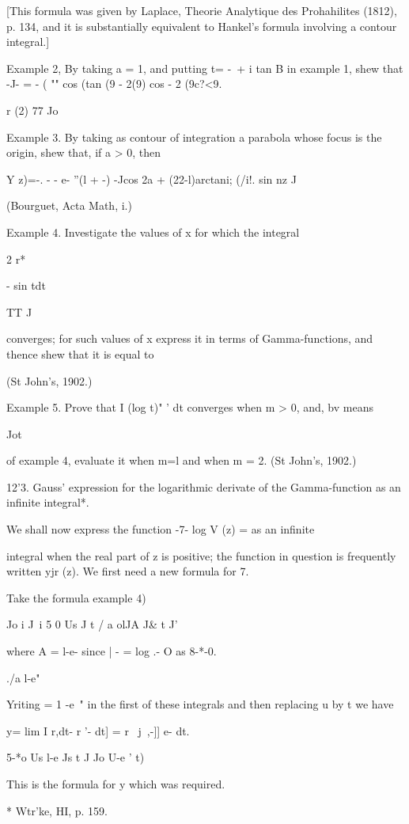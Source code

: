 [This formula was given by Laplace, Theorie Analytique des
Prohahilites (1812), p. 134, and it is substantially equivalent to
Hankel's formula involving a contour integral.]

Example 2, By taking a = 1, and putting t= -\ + i tan B in example 1,
shew that -J- = - ( "" cos (tan (9 - 2(9) cos - 2 (9c?<9.

r (2) 77 Jo

Example 3. By taking as contour of integration a parabola whose focus
is the origin, shew that, if a > 0, then

Y z)=-. - - e- ''(l + -) -Jcos 2a + (22-l)arctani; (/i!. sin nz J

(Bourguet, Acta Math, i.)

Example 4. Investigate the values of x for which the integral

2 r*

 - sin tdt

TT J

converges; for such values of x express it in terms of
Gamma-functions, and thence shew that it is equal to

(St John's, 1902.)

Example 5. Prove that I (log t)" ' dt converges when m > 0, and, bv
means

Jot

of example 4, evaluate it when m=l and when m = 2. (St John's, 1902.)

12'3. Gauss' expression for the logarithmic derivate of the
Gamma-function as an infinite integral*.

We shall now express the function -7- log V (z) = as an infinite

integral when the real part of z is positive; the function in
question is frequently written yjr (z). We first need a new formula
for 7.

Take the formula  example 4)

  Jo i J\ i 5 0 Us J t / a olJA J\& t J'

where A = l-e- since | - = log .- O as 8-*-0.

./a l-e"

 Yriting = 1 -e~" in the first of these integrals and then replacing u
by t we have

y= lim I r,dt- r '- dt] = r \ j~,-]] e- dt.

5-*o Us l-e Js t J Jo U-e ' t)

This is the formula for y which was required.

* Wtr'ke, HI, p. 159.

